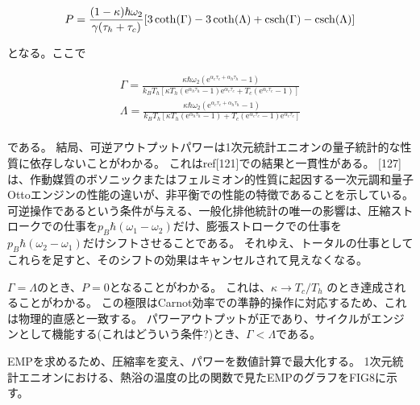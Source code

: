 \documentclass[a4paper,11pt]{jsarticle}
\numberwithin{equation}{section}
\begin{document}
\begin{align}
P=\frac{(1-\kappa)\hbar\omega_2}{\gamma(\tau_h+\tau_c)}[3\coth(\Gamma)-3\coth(\Lambda)+\csch(\Gamma)-\csch(\Lambda)]
\end{align}

となる。ここで

\begin{align}
\Gamma=\frac{\kappa\hbar\omega_2 (\mathrm{e}^{\alpha_c\tau_c+\alpha_h\tau_h}-1)}{k_B T_h \left[\kappa T_h (\mathrm{e}^{\alpha_h \tau_h}-1)\mathrm{e}^{\alpha_c \tau_c}+T_c(\mathrm{e}^{\alpha_c \tau_c}-1)\right]}\\
\Lambda=\frac{\kappa\hbar\omega_2 (\mathrm{e}^{\alpha_c\tau_c+\alpha_h\tau_h}-1)}{k_B T_h \left[\kappa T_h (\mathrm{e}^{\alpha_h \tau_h}-1)+T_c(\mathrm{e}^{\alpha_c \tau_c}-1)\mathrm{e}^{\alpha_c \tau_c}\right]}\\
\end{align}

である。
結局、可逆アウトプットパワーは1次元統計エニオンの量子統計的な性質に依存しないことがわかる。
これはref[121]での結果と一貫性がある。
[127]は、作動媒質のボソニックまたはフェルミオン的性質に起因する一次元調和量子Ottoエンジンの性能の違いが、非平衡での性能の特徴であることを示している。
可逆操作であるという条件が与える、一般化排他統計の唯一の影響は、圧縮ストロークでの仕事を$p_B \hbar (\omega_1 - \omega_2)$だけ、膨張ストロークでの仕事を$p_B \hbar (\omega_2 - \omega_1)$だけシフトさせることである。
それゆえ、トータルの仕事としてこれらを足すと、そのシフトの効果はキャンセルされて見えなくなる。

$\Gamma=\Lambda$のとき、$P=0$となることがわかる。
これは、$\kappa \to {T_c}/{T_h}$ のとき達成されることがわかる。
この極限はCarnot効率での準静的操作に対応するため、これは物理的直感と一致する。
パワーアウトプットが正であり、サイクルがエンジンとして機能する(これはどういう条件?)とき、$\Gamma < \Lambda$である。

EMPを求めるため、圧縮率を変え、パワーを数値計算で最大化する。
1次元統計エニオンにおける、熱浴の温度の比の関数で見たEMPのグラフをFIG8に示す。
\end{document}
